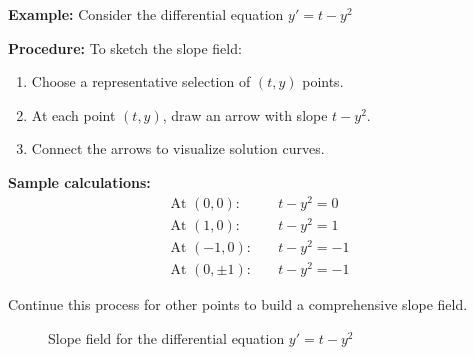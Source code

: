 \documentclass{article}
\begin{document}
\textbf{Example:} Consider the differential equation $y' = t - y^2$

\textbf{Procedure:} To sketch the slope field:
\begin{enumerate}
    \item Choose a representative selection of $(t, y)$ points.
    \item At each point $(t,y)$, draw an arrow with slope $t - y^2$.
    \item Connect the arrows to visualize solution curves.
\end{enumerate}

\textbf{Sample calculations:}
\begin{align*}
    \text{At } (0,0):& \quad t - y^2 = 0 \\
    \text{At } (1,0):& \quad t - y^2 = 1 \\
    \text{At } (-1,0):& \quad t - y^2 = -1 \\
    \text{At } (0,\pm 1):& \quad t - y^2 = -1
\end{align*}

\pagebreak
Continue this process for other points to build a comprehensive slope field.

\begin{figure}[h!]
    \centering
    \caption{Slope field for the differential equation $y' = t - y^2$}
    \label{fig:slope_field}
\end{figure}
\end{document}
